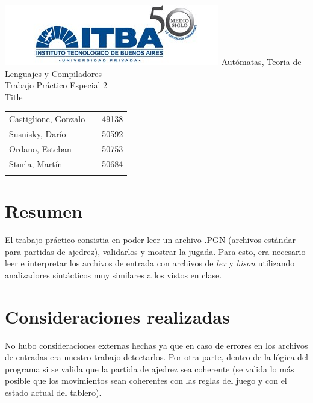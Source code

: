 \documentclass[a4paper,10pt]{article}
\begin{document}
\begin{titlepage}
	\thispagestyle{empty}
	\begin{center}
		\includegraphics[scale=0.7]{./images/itba.jpg}
		\vfill
		\Huge{Autómatas, Teoria de Lenguajes y Compiladores}\\
		\vspace{1cm}
		\huge{Trabajo Práctico Especial 2} \\
		\vspace{0.3cm}
		\huge{Title}
	\end{center}
	\vspace{2cm}
	\large{
		\begin{tabular}{lcr}
			Castiglione, Gonzalo & & 49138 \\
			Susnisky, Darío & & 50592 \\
			Ordano, Esteban & & 50753 \\
			Sturla, Martín & & 50684 \\
			\\ 
		\end{tabular}
	}
	\vfill
	\flushright{\today}
\end{titlepage}

\newpage


	\thispagestyle{empty}
\tableofcontents

\newpage

\setcounter{page}{1}

\newpage

\section{Resumen}
El trabajo práctico consistia en poder leer un archivo .PGN (archivos estándar para partidas de ajedrez), validarlos y mostrar
la jugada. Para esto, era necesario leer e interpretar los archivos de entrada con archivos de \textit{lex} y \textit{bison}
 utilizando analizadores sintácticos muy similares a los vistos en clase.

\newpage

\section{Consideraciones realizadas}
    No hubo consideraciones externas hechas ya que en caso de errores en los archivos de entradas era nuestro trabajo
     detectarlos. Por otra parte, dentro de la lógica del programa si se valida que la partida de ajedrez sea coherente 
      (se valida lo más posible que los movimientos sean coherentes con las reglas del juego y con el estado actual del tablero). \\
\end{document}
